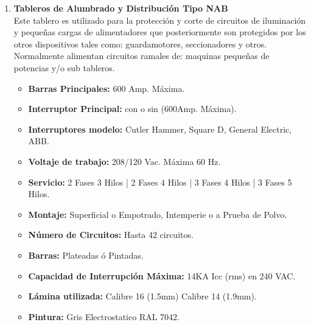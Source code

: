 \documentclass[11pt,letterpaper]{article}
\begin{document}
\begin{enumerate}
	\item \textbf{Tableros de Alumbrado y Distribución Tipo NAB}\\
		Este tablero es utilizado para la protección y corte de circuitos de iluminación y pequeñas cargas de alimentadores que posteriormente son protegidos por los otros dispositivos tales como: guardamotores, seccionadores y otros. Normalmente  alimentan circuitos ramales de: maquinas pequeñas de potencias y/o sub tableros.
		\begin{itemize}
			\item \textbf{Barras Principales:} 600 Amp. Máxima.
			\item \textbf{Interruptor Principal:} con o sin (600Amp. Máxima).
			\item \textbf{Interruptores modelo:} Cutler Hammer, Square D, General Electric, ABB.
			\item \textbf{Voltaje de trabajo:} 208/120 Vac. Máxima 60 Hz.
			\item \textbf{Servicio:} 2 Fases 3 Hilos | 2 Fases 4 Hilos | 3 Fases 4 Hilos | 3 Fases 5 Hilos.
			\item \textbf{Montaje:} Superficial o Empotrado, Intemperie o a Prueba de Polvo.
			\item \textbf{Número de Circuitos:} Hasta 42 circuitos.
			\item \textbf{Barras:} Plateadas ó Pintadas.
			\item \textbf{Capacidad de Interrupción Máxima:} 14KA Icc (rms) en 240 VAC.
			\item \textbf{Lámina utilizada:} Calibre 16 (1.5mm) Calibre 14 (1.9mm).
			\item \textbf{Pintura:} Gris Electrostatico RAL 7042.
		\end{itemize}
	

\end{enumerate}
\end{document}
